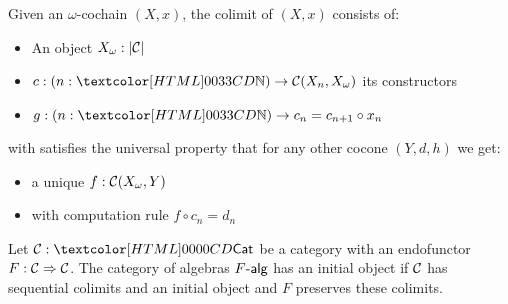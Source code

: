 \begin{definition}
  Given an $\omega$-cochain $(X,x)$, the colimit of $(X,x)$ consists
  of:
  \begin{itemize}
  \item An object $X_\omega : | \mathcal{C} |$
  \item $c : (n : \natty) \to \Cc(X_n,X_\omega)$ its constructors
  \item $g : (n : \natty) \to c_n = c_{n+1} \circ x_n$
  \end{itemize}
  with satisfies the universal property that for any other cocone $(Y,d,h)$ we get:
  \begin{itemize}
  \item a unique $f : \mathcal{C}(X_\omega, Y)$
  \item with computation rule $f \circ c_n = d_n$
  \end{itemize}
\end{definition}

\begin{theorem}[Ad\'amek]
  \label{adamek-thm}
  Let $\Cc : \Cat$ be a category with an endofunctor
  $F : \mathcal{C} \Rightarrow \mathcal{C}$. The category of algebras $\algcat{F}$ has an
  initial object if $\mathcal{C}$ has sequential colimits and an initial
  object and $F$ preserves these colimits.
\end{theorem}

